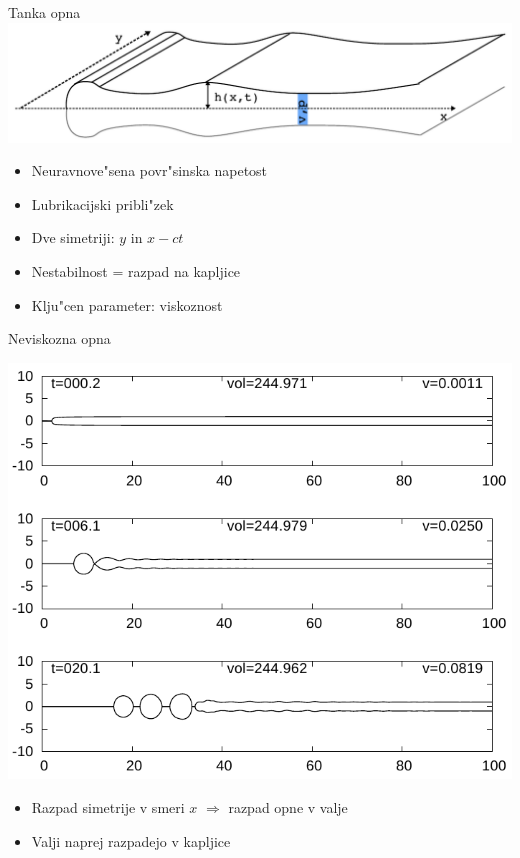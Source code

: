 \documentclass{beamer}
\begin{document}
\begin{frame}{Tanka opna}
 \includegraphics[width=.8\textwidth]{./Slike/mehurcek-skica}
 \begin{itemize}
  \item Neuravnove"sena povr"sinska napetost
  \item Lubrikacijski pribli"zek
  \item Dve simetriji: $y$ in $x-ct$
  \item Nestabilnost = razpad na kapljice
  \item Klju"cen parameter: viskoznost
 \end{itemize}

\end{frame}

\begin{frame}{Neviskozna opna}
\begin{center}
 \includegraphics[height=.5\textheight]{./Slike/mehurcek-rezultat-1}
\end{center}
 \begin{itemize}
  \item Razpad simetrije v smeri $x$ $\Rightarrow$ razpad opne v valje
  \item Valji naprej razpadejo v kapljice
 \end{itemize}

\end{frame}
\end{document}
